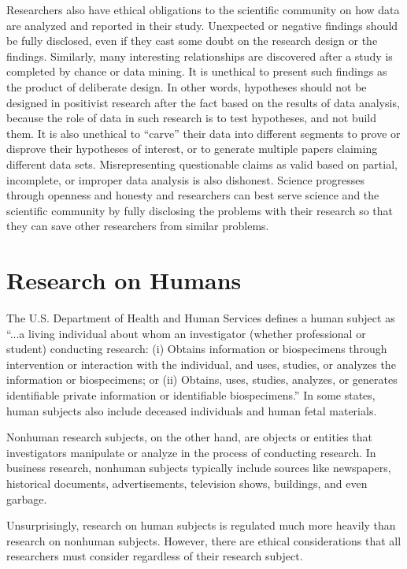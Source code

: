 Researchers also have ethical obligations to the scientific community on how data are analyzed and reported in their study. Unexpected or negative findings should be fully disclosed, even if they cast some doubt on the research design or the findings. Similarly, many interesting relationships are discovered after a study is completed by chance or data mining. It is unethical to present such findings as the product of deliberate design. In other words, hypotheses should not be designed in positivist research after the fact based on the results of data analysis, because the role of data in such research is to test hypotheses, and not build them. It is also unethical to ``carve'' their data into different segments to prove or disprove their hypotheses of interest, or to generate multiple papers claiming different data sets. Misrepresenting questionable claims as valid based on partial, incomplete, or improper data analysis is also dishonest. Science progresses through openness and honesty and researchers can best serve science and the scientific community by fully disclosing the problems with their research so that they can save other researchers from similar problems.

\section{Research on Humans}

The U.S. Department of Health and Human Services defines a human subject as ``...a living individual about whom an investigator (whether professional or student) conducting research: (i) Obtains information or biospecimens through intervention or interaction with the individual, and uses, studies, or analyzes the information or biospecimens; or (ii) Obtains, uses, studies, analyzes, or generates identifiable private information or identifiable biospecimens.''\cite{hhs2018human} In some states, human subjects also include deceased individuals and human fetal materials. 

Nonhuman research subjects, on the other hand, are objects or entities that investigators manipulate or analyze in the process of conducting research. In business research, nonhuman subjects typically include sources like newspapers, historical documents, advertisements, television shows, buildings, and even garbage.

Unsurprisingly, research on human subjects is regulated much more heavily than research on nonhuman subjects. However, there are ethical considerations that all researchers must consider regardless of their research subject.

